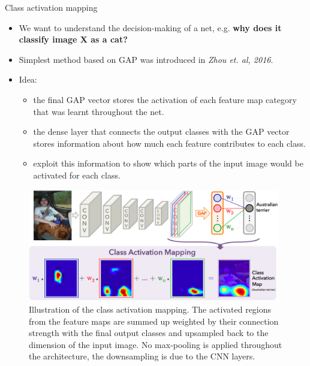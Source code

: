 \begin{vbframe}{Class activation mapping}
    \begin{itemize}
        \item We want to understand the decision-making of a net, e.g. \textbf{why does it classify image X as a cat?}
        \item Simplest method based on GAP was introduced in \textit{Zhou et. al, 2016}.
        \item Idea: 
        \begin{itemize}
            \item the final GAP vector stores the activation of each feature map category that was learnt throughout the net.
            \item the dense layer that connects the output classes with the GAP vector stores information about how much each feature contributes to each class.
            \item exploit this information to show which parts of the input image would be activated for each class.
        \end{itemize}
    \end{itemize}
    
\framebreak

    \begin{figure}
    \centering
    \includegraphics[width=11cm]{plots/05_conv_variations/cam/cam_scheme.png}
    \caption{Illustration of the class activation mapping. The activated regions from the feature maps are summed up weighted by their connection strength with the final output classes and upsampled back to the dimension of the input image. No max-pooling is applied throughout the architecture, the downsampling is due to the CNN layers. }
    \end{figure}
\framebreak


\end{vbframe}
